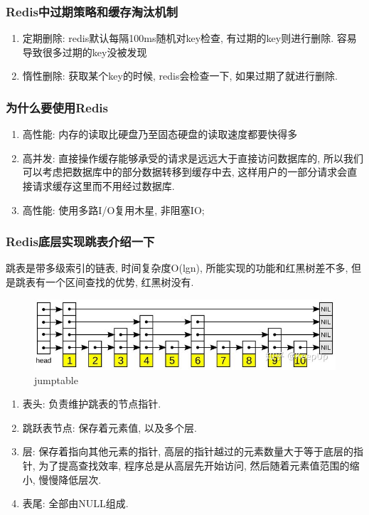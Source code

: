 \documentclass[UTF8]{ctexart}
\begin{document}
\subsubsection{Redis中过期策略和缓存淘汰机制}
\begin{enumerate}
	\item 定期删除: redis默认每隔100ms随机对key检查, 有过期的key则进行删除. 容易导致很多过期的key没被发现
	\item 惰性删除: 获取某个key的时候, redis会检查一下, 如果过期了就进行删除.
\end{enumerate}
\subsubsection{为什么要使用Redis}
\begin{enumerate}
	\item 高性能: 内存的读取比硬盘乃至固态硬盘的读取速度都要快得多
	\item 高并发: 直接操作缓存能够承受的请求是远远大于直接访问数据库的, 所以我们可以考虑把数据库中的部分数据转移到缓存中去, 这样用户的一部分请求会直接请求缓存这里而不用经过数据库.
	\item 高性能: 使用多路I/O复用木星, 非阻塞IO;
\end{enumerate}
\subsubsection{Redis底层实现跳表介绍一下}
跳表是带多级索引的链表, 时间复杂度O(lgn), 所能实现的功能和红黑树差不多, 但是跳表有一个区间查找的优势, 红黑树没有.
\begin{figure}
	\centering
	\includegraphics[width=0.7\linewidth]{figures/jump_table.jpg}
	\caption{jumptable}
	\label{fig:jumptable}
\end{figure}
\begin{enumerate}
	\item 表头: 负责维护跳表的节点指针.
	\item 跳跃表节点: 保存着元素值, 以及多个层.
	\item 层: 保存着指向其他元素的指针, 高层的指针越过的元素数量大于等于底层的指针, 为了提高查找效率, 程序总是从高层先开始访问, 然后随着元素值范围的缩小, 慢慢降低层次.
	\item 表尾: 全部由NULL组成.
\end{enumerate}
\end{document}
